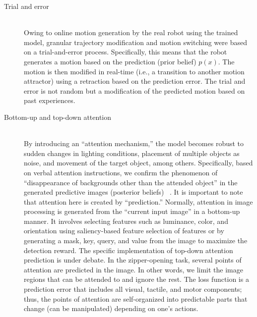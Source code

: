 \begin{description}
\item[Trial and error]\mbox{}\\
Owing to online motion generation by the real robot using the trained model, granular trajectory modification and motion switching were based on a trial-and-error process.
Specifically, this means that the robot generates a motion based on the prediction (prior belief) $p(x)$. The motion is then modified in real-time (i.e., a transition to another motion attractor) using a retraction based on the prediction error.
The trial and error is not random but a modification of the predicted motion based on past experiences.


\item[Bottom-up and top-down attention]\mbox{}\\
By introducing an ``attention mechanism,'' the model becomes robust to sudden changes in lighting conditions, placement of multiple objects as noise, and movement of the target object, among others. Specifically, based on verbal attention instructions, we confirm the phenomenon of ``disappearance of backgrounds other than the attended object'' in the generated predictive images (posterior beliefs) ~\cite{ito2022integrated}. It is important to note that attention here is created by ``prediction.'' Normally, attention in image processing is generated from the ``current input image'' in a bottom-up manner. It involves selecting features such as luminance, color, and orientation using saliency-based feature selection of features or by generating a mask, key, query, and value from the image to maximize the detection reward. The specific implementation of top-down attention prediction is under debate. In the zipper-opening task, several points of attention are predicted in the image. In other words, we limit the image regions that can be attended to and ignore the rest. The loss function is a prediction error that includes all visual, tactile, and motor components; thus, the points of attention are self-organized into predictable parts that change (can be manipulated) depending on one's actions.
\end{description}
